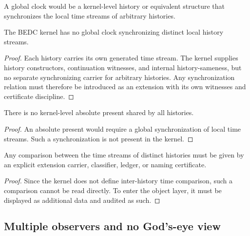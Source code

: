 \begin{definition}
\label{def:philosophy-global-clock}
A global clock would be a kernel-level history or equivalent structure
that synchronizes the local time streams of arbitrary histories.
\end{definition}

\begin{theorem}
\label{thm:philosophy-no-kernel-global-clock}
The BEDC kernel has no global clock synchronizing distinct local history
streams.
\end{theorem}
\begin{proof}
Each history carries its own generated time stream. The kernel supplies
history constructors, continuation witnesses, and internal
history-sameness, but no separate synchronizing carrier for arbitrary
histories. Any synchronization relation must therefore be introduced as
an extension with its own witnesses and certificate discipline.
\end{proof}

\begin{corollary}
\label{cor:philosophy-no-absolute-present}
There is no kernel-level absolute present shared by all histories.
\end{corollary}
\begin{proof}
An absolute present would require a global synchronization of local
time streams. Such a synchronization is not present in the kernel.
\end{proof}

\begin{corollary}
\label{cor:philosophy-cross-history-time-comparison-certified}
Any comparison between the time streams of distinct histories must be
given by an explicit extension carrier, classifier, ledger, or naming
certificate.
\end{corollary}
\begin{proof}
Since the kernel does not define inter-history time comparison, such a
comparison cannot be read directly. To enter the object layer, it must
be displayed as additional data and audited as such.
\end{proof}

\subsection{Multiple observers and no God's-eye view}
\label{subsec:philosophy-multiple-observers-no-gods-eye-view}

